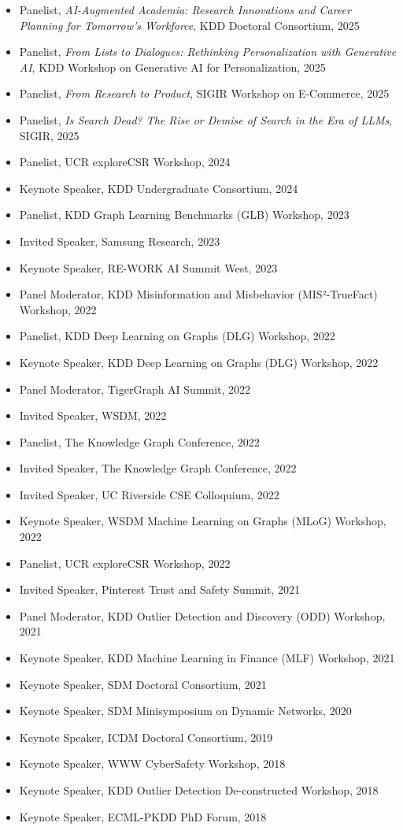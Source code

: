 \documentclass{article}
\begin{document}
\begin{itemize}
\item Panelist, \emph{AI-Augmented Academia: Research Innovations and Career Planning for Tomorrow's Workforce}, KDD Doctoral Consortium, 2025
\item Panelist, \emph{From Lists to Dialogues: Rethinking Personalization with Generative AI}, KDD Workshop on Generative AI for Personalization, 2025
\item Panelist, \emph{From Research to Product}, SIGIR Workshop on E-Commerce, 2025
\item Panelist, \emph{Is Search Dead? The Rise or Demise of Search in the Era of LLMs}, SIGIR, 2025
\item Panelist, UCR exploreCSR Workshop, 2024
\item Keynote Speaker, KDD Undergraduate Consortium, 2024
\item Panelist, KDD Graph Learning Benchmarks (GLB) Workshop, 2023
\item Invited Speaker, Samsung Research, 2023
\item Keynote Speaker, RE-WORK AI Summit West, 2023
\item Panel Moderator, KDD Misinformation and Misbehavior (MIS²-TrueFact) Workshop, 2022
\item Panelist, KDD Deep Learning on Graphs (DLG) Workshop, 2022
\item Keynote Speaker, KDD Deep Learning on Graphs (DLG) Workshop, 2022
\item Panel Moderator, TigerGraph AI Summit, 2022
\item Invited Speaker, WSDM, 2022
\item Panelist, The Knowledge Graph Conference, 2022
\item Invited Speaker, The Knowledge Graph Conference, 2022
\item Invited Speaker, UC Riverside CSE Colloquium, 2022
\item Keynote Speaker, WSDM Machine Learning on Graphs (MLoG) Workshop, 2022
\item Panelist, UCR exploreCSR Workshop, 2022
\item Invited Speaker, Pinterest Trust and Safety Summit, 2021
\item Panel Moderator, KDD Outlier Detection and Discovery (ODD) Workshop, 2021
\item Keynote Speaker, KDD Machine Learning in Finance (MLF) Workshop, 2021
\item Keynote Speaker, SDM Doctoral Consortium, 2021
\item Keynote Speaker, SDM Minisymposium on Dynamic Networks, 2020
\item Keynote Speaker, ICDM Doctoral Consortium, 2019
\item Keynote Speaker, WWW CyberSafety Workshop, 2018
\item Keynote Speaker, KDD Outlier Detection De-constructed Workshop, 2018
\item Keynote Speaker, ECML-PKDD PhD Forum, 2018
\end{itemize}
\end{document}
